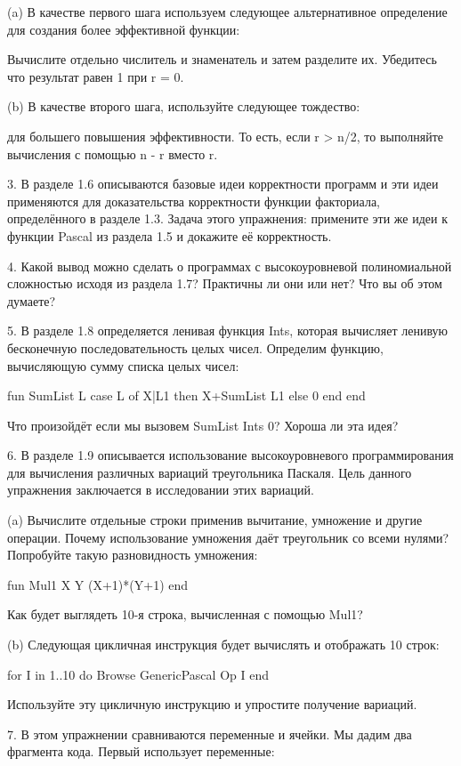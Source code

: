 (a) В качестве первого шага используем следующее альтернативное определение для создания более эффективной функции:

Вычислите отдельно числитель и знаменатель и затем разделите их. Убедитесь что результат равен 1 при r = 0.

(b) В качестве второго шага, используйте следующее тождество:

для большего повышения эффективности. То есть, если r > n/2, то выполняйте вычисления с помощью n - r вместо r.

3. В разделе 1.6 описываются базовые идеи корректности программ и эти идеи применяются для доказательства корректности функции факториала, определённого в разделе 1.3. Задача этого упражнения: примените эти же идеи к функции Pascal из раздела 1.5 и докажите её корректность.

4. Какой вывод можно сделать о программах с высокоуровневой полиномиальной сложностью исходя из раздела 1.7? Практичны ли они или нет? Что вы об этом думаете?

5. В разделе 1.8 определяется ленивая функция Ints, которая вычисляет ленивую бесконечную последовательность целых чисел. Определим функцию, вычисляющую сумму списка целых чисел:

fun {SumList L}
case L of X|L1 then X+{SumList L1}
else 0 end
end

Что произойдёт если мы вызовем {SumList {Ints 0}}? Хороша ли эта идея?

6. В разделе 1.9 описывается использование высокоуровневого программирования для вычисления различных вариаций треугольника Паскаля. Цель данного упражнения заключается в исследовании этих вариаций.

(a) Вычислите отдельные строки применив вычитание, умножение и другие операции. Почему использование умножения даёт треугольник со всеми нулями? Попробуйте такую разновидность умножения:

fun {Mul1 X Y} (X+1)*(Y+1) end

Как будет выглядеть 10-я строка, вычисленная с помощью Mul1?

(b) Следующая цикличная инструкция будет вычислять и отображать 10 строк:

for I in 1..10 do {Browse {GenericPascal Op I}} end

Используйте эту цикличную инструкцию и упростите получение вариаций.

7. В этом упражнении сравниваются переменные и ячейки. Мы дадим два фрагмента кода. Первый использует переменные:


